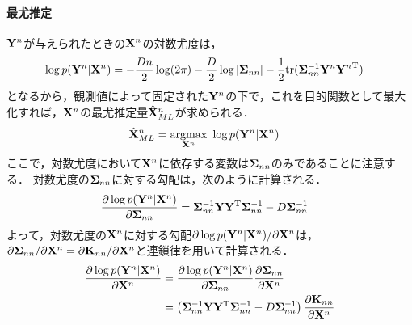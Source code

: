\documentclass[11pt,a4j]{article}
\begin{document}
        \paragraph{最尤推定}
          ${\bf Y}^n$が与えられたときの${\bf X}^n$の対数尤度は，
          \begin{align}
            \log p({\bf Y}^n|{\bf X}^n)
            &= -\frac{Dn}{2} \log (2 \pi) - \frac{D}{2} \log |{\bf \Sigma}_{nn}| - \frac{1}{2} {\rm tr} ({\bf \Sigma}_{nn}^{-1} {{\bf Y}^n}{{\bf Y}^n}^{\mathrm{T}})
          \end{align}
          となるから，観測値によって固定された${\bf Y}^n$の下で，これを目的関数として最大化すれば，${\bf X}^n$の最尤推定量$\hat{\bf X}^{n}_{ML}$が求められる．
          \begin{align}
            \hat{\bf X}^{n}_{ML} &= \underset{{\bf X}^n}{\rm argmax} ~ \log p( {\bf Y}^n | {\bf X}^n) 
          \end{align}
          ここで，対数尤度において${\bf X}^n$に依存する変数は${\bf \Sigma}_{nn}$のみであることに注意する．
          対数尤度の${\bf \Sigma}_{nn}$に対する勾配は，次のように計算される．
          \begin{align}
            \frac{\partial \log p({\bf Y}^n|{\bf X}^n)}{\partial {\bf \Sigma}_{nn}} &= {\bf \Sigma}_{nn}^{-1} {\bf Y}{\bf Y}^{\mathrm{T}} {\bf \Sigma}_{nn}^{-1} - D {\bf \Sigma}_{nn}^{-1} 
          \end{align}
          よって，対数尤度の${\bf X}^n$に対する勾配$\partial \log p({\bf Y}^n|{\bf X}^n) / \partial {\bf X}^n$は，
          $\partial {\bf \Sigma}_{nn} / \partial {\bf X}^n = \partial {\bf K}_{nn} / \partial {\bf X}^n$と連鎖律を用いて計算される．
          \begin{align}
            \frac{\partial \log p({\bf Y}^n | {\bf X}^n) }{ \partial {\bf X}^n } &= \frac{\partial \log p({\bf Y}^n | {\bf X}^n) }{\partial {\bf \Sigma}_{nn} } \frac{\partial {\bf \Sigma}_{nn}}{\partial {\bf X}^n} \\
            &= \left( {\bf \Sigma}_{nn}^{-1} {\bf Y}{\bf Y}^{\mathrm{T}} {\bf \Sigma}_{nn}^{-1} - D {\bf \Sigma}_{nn}^{-1} \right) \frac{\partial {\bf K}_{nn} }{\partial {\bf X}^n }
          \end{align}
\end{document}
